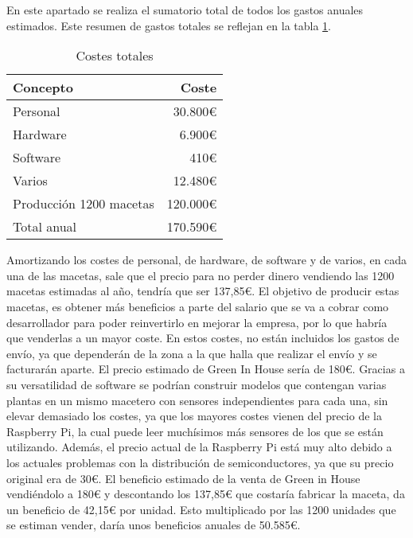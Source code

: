             En este apartado se realiza el sumatorio total de todos los gastos anuales estimados. Este resumen de gastos totales se reflejan en la tabla \ref{tab:costes totales por maceta de plan de negocio}.
            \begin{table}[H]
                \centering
                \caption{Costes totales}
                \begin{tabular}{|l|r|}
                    \hline
                    Concepto & Coste \\
                    \hline
                    Personal & 30.800€ \\
                    Hardware & 6.900€ \\
                    Software & 410€ \\
                    Varios & 12.480€ \\
                    Producción 1200 macetas & 120.000€ \\
                    \hline
                    Total anual & 170.590€ \\
                    \hline
                \end{tabular}
                \label{tab:costes totales por maceta de plan de negocio}
            \end{table}
            Amortizando los costes de personal, de hardware, de software y de varios, en cada una de las macetas, sale que el precio para no perder dinero vendiendo las 1200 macetas estimadas al año, tendría que ser 137,85€. El objetivo de producir estas macetas, es obtener más beneficios a parte del salario que se va a cobrar como desarrollador para poder reinvertirlo en mejorar la empresa, por lo que habría que venderlas a un mayor coste. En estos costes, no están incluidos los gastos de envío, ya que dependerán de la zona a la que halla que realizar el envío y se facturarán aparte. El precio estimado de Green In House sería de 180€. 
            Gracias a su versatilidad de software se podrían construir modelos que contengan varias plantas en un mismo macetero con sensores independientes para cada una, sin elevar demasiado los costes, ya que los mayores costes vienen del precio de la Raspberry Pi, la cual puede leer muchísimos más sensores de los que se están utilizando. Además, el precio actual de la Raspberry Pi está muy alto debido a los actuales problemas con la distribución de semiconductores, ya que su precio original era de 30€.
            El beneficio estimado de la venta de Green in House vendiéndolo a 180€ y descontando los 137,85€ que costaría fabricar la maceta, da un beneficio de 42,15€ por unidad. Esto multiplicado por las 1200 unidades que se estiman vender, daría unos beneficios anuales de 50.585€.

